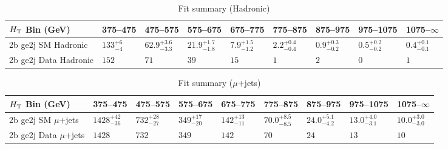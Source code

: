 \documentclass[8pt]{article}
\def\scalht{\mbox{$H_{\rm{T}}$}\xspace}
\newcommand\T{\rule{0pt}{2.6ex}}
\begin{document}
\begin{table}[ht!]
\caption{Fit summary (Hadronic)}
\label{tab:ensemble-summary}
\centering
\begin{tabular}{ lllllllll }

\hline
\scalht Bin (GeV)       & 375--475                       & 475--575                       & 575--675                       & 675--775                       & 775--875                       & 875--975                       & 975--1075                      & 1075--$\infty$                 \\ [1.000000ex]
\hline
2b ge2j SM Hadronic\T   & $133^{+6}_{-4}$                & $62.9^{+3.6}_{-3.3}$           & $21.9^{+1.7}_{-1.8}$           & $7.9^{+1.5}_{-1.2}$            & $2.2^{+0.4}_{-0.4}$            & $0.9^{+0.3}_{-0.2}$            & $0.5^{+0.2}_{-0.2}$            & $0.4^{+0.1}_{-0.1}$            \\ 
2b ge2j Data Hadronic\T & $152$                          & $71$                           & $39$                           & $15$                           & $1$                            & $2$                            & $0$                            & $1$                            \\ 
\hline

\end{tabular}
\end{table}
\begin{table}[ht!]
\caption{Fit summary ($\mu$+jets)}
\label{tab:ensemble-summary}
\centering
\begin{tabular}{ lllllllll }

\hline
\scalht Bin (GeV)       & 375--475                       & 475--575                       & 575--675                       & 675--775                       & 775--875                       & 875--975                       & 975--1075                      & 1075--$\infty$                 \\ [1.000000ex]
\hline
2b ge2j SM $\mu$+jets\T & $1428^{+42}_{-36}$             & $732^{+28}_{-27}$              & $349^{+17}_{-20}$              & $142^{+13}_{-11}$              & $70.0^{+8.5}_{-8.5}$           & $24.0^{+5.1}_{-4.2}$           & $13.0^{+4.0}_{-3.1}$           & $10.0^{+3.0}_{-3.0}$           \\ 
2b ge2j Data $\mu$+jets\T & $1428$                         & $732$                          & $349$                          & $142$                          & $70$                           & $24$                           & $13$                           & $10$                           \\ 
\hline

\end{tabular}
\end{table}
\end{document}
